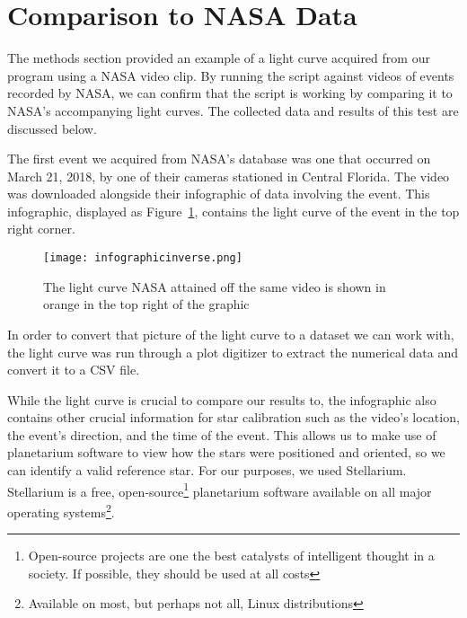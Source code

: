 \section{Comparison to NASA Data}

The methods section provided an example of a light curve acquired from our program using a NASA video clip. By running the script against videos of events recorded by NASA, we can confirm that the script is working by comparing it to NASA's accompanying light curves. The collected data and results of this test are discussed below.

The first event we acquired from NASA's database was one that occurred on March 21, 2018, by one of their cameras stationed in Central Florida. The video was downloaded alongside their infographic of data involving the event. This infographic, displayed as Figure~\ref{fig:infographic}, contains the light curve of the event in the top right corner. 
\begin{figure}[ht!]
	\centering
	\texttt{[image: infographicinverse.png]}
	\caption{The light curve NASA attained off the same video is shown in orange in the top right of the graphic\protect\cite{NASA2018}}
	\label{fig:infographic}
\end{figure}
In order to convert that picture of the light curve to a dataset we can work with, the light curve was run through a plot digitizer to extract the numerical data and convert it to a CSV file.

While the light curve is crucial to compare our results to, the infographic also contains other crucial information for star calibration such as the video's location, the event's direction, and the time of the event. This allows us to make use of planetarium software to view how the stars were positioned and oriented, so we can identify a valid reference star. For our purposes, we used Stellarium. Stellarium is a free, open-source\footnote{Open-source projects are one the best catalysts of intelligent thought in a society. If possible, they should be used at all costs} planetarium software available on all major operating systems\footnote{Available on most, but perhaps not all, Linux distributions}.

